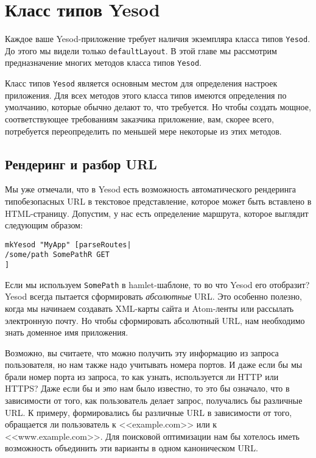 \chapter {Класс типов Yesod}\label{chap:yesod-typeclass}

Каждое ваше Yesod-приложение требует наличия экземпляра класса типов
\lstinline!Yesod!. До этого мы видели только \lstinline!defaultLayout!. В этой
главе мы рассмотрим предназначение многих методов класса типов
\lstinline!Yesod!.

Класс типов \lstinline!Yesod! является основным местом для определения настроек
приложения. Для всех методов этого класса типов имеются определения по
умолчанию, которые обычно делают то, что требуется. Но чтобы создать мощное,
соответствующее требованиям заказчика приложение, вам, скорее всего,
потребуется переопределить по меньшей мере некоторые из этих методов.

\section {Рендеринг и разбор URL}

Мы уже отмечали, что в Yesod есть возможность автоматического рендеринга
типобезопасных URL в текстовое представление, которое может быть вставлено в
HTML-страницу. Допустим, у нас есть определение маршрута, которое выглядит
следующим образом:

\begin{lstlisting}
mkYesod "MyApp" [parseRoutes|
/some/path SomePathR GET
]
\end{lstlisting}

Если мы используем \lstinline!SomePath! в hamlet-шаблоне, то во что Yesod его
отобразит? Yesod всегда пытается сформировать \emph{абсолютные} URL. Это
особенно полезно, когда мы начинаем создавать XML-карты сайта и Atom-ленты или
рассылать электронную почту. Но чтобы сформировать абсолютный URL, нам
необходимо знать доменное имя приложения.

Возможно, вы считаете, что можно получить эту информацию из запроса
пользователя, но нам также надо учитывать номера портов. И даже если бы мы
брали номер порта из запроса, то как узнать, используется ли HTTP или HTTPS?
Даже если бы и \emph{это} нам было известно, то это бы означало, что в
зависимости от того, как пользователь делает запрос, получались бы различные
URL. К примеру, формировались бы различные URL в зависимости от того,
обращается ли пользователь к <<example.com>> или к <<www.example.com>>. Для
поисковой оптимизации нам бы хотелось иметь возможность объединить эти варианты
в одном каноническом URL.

